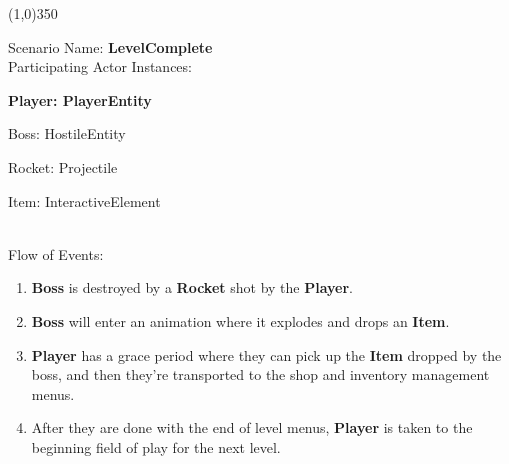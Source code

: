 \documentclass[12pt]{article}       %
\begin{document}
\begin{center} \line(1,0){350} \end{center}
Scenario Name: {\bf LevelComplete} \\
Participating Actor Instances:        \hspace{46pt} {\bf Player: PlayerEntity

					          \hspace{2.6 in}   Boss: HostileEntity 

                                                      \hspace{2.6 in}   Rocket: Projectile 

					          \hspace{2.6in}    Item: InteractiveElement} \vspace{10pt}  \\ 
Flow of Events: 
\begin{enumerate} 
\item {\bf Boss} is destroyed by a {\bf Rocket} shot by the {\bf Player}.
\item {\bf Boss} will enter an animation where it explodes and drops an {\bf Item}.
\item {\bf Player} has a grace period where they can pick up the {\bf Item} dropped by the boss, and then they’re transported to the shop and inventory management menus.
\item After they are done with the end of level menus, {\bf Player} is taken to the beginning field of play for the next level. 
\end{enumerate}
\end{document}
